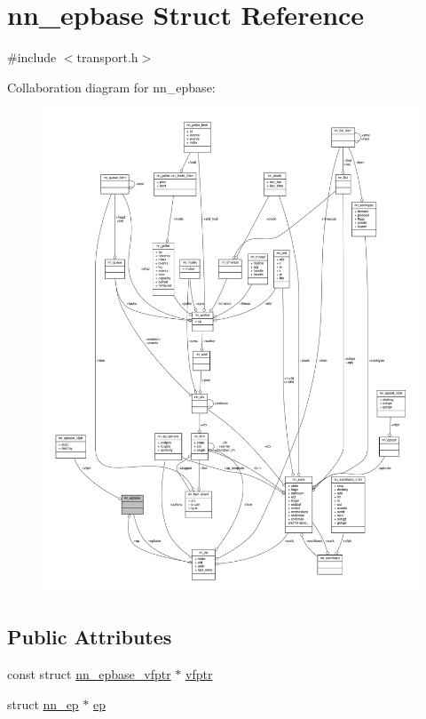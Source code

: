 \hypertarget{structnn__epbase}{}\section{nn\+\_\+epbase Struct Reference}
\label{structnn__epbase}


{\ttfamily \#include $<$transport.\+h$>$}



Collaboration diagram for nn\+\_\+epbase\+:\nopagebreak
\begin{figure}[H]
\begin{center}
\leavevmode
\includegraphics[width=350pt]{structnn__epbase__coll__graph}
\end{center}
\end{figure}
\subsection*{Public Attributes}
\begin{DoxyCompactItemize}
\item 
const struct \hyperlink{structnn__epbase__vfptr}{nn\+\_\+epbase\+\_\+vfptr} $\ast$ \hyperlink{structnn__epbase_a7aeef264c3ec9adab7f7225e84689e41}{vfptr}
\item 
struct \hyperlink{structnn__ep}{nn\+\_\+ep} $\ast$ \hyperlink{structnn__epbase_a9256f20b0f06b8eab213745afe91fced}{ep}
\end{DoxyCompactItemize}


